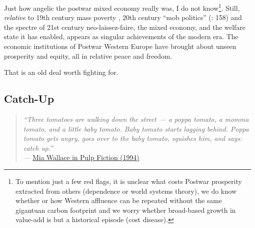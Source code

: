 \documentclass[11pt,a4paper,oneside,openright]{article}
\begin{document}
Just how angelic the postwar mixed economy really was, I do not know\footnote{
	To mention just a few red flags, it is unclear what costs Postwar prosperity extracted from others (dependence or world systems theory), we do know whether or how Western affluence can be repeated without the same gigantuan carbon footprint and we worry whether broad-based growth in value-add is but a historical episode (cost disease).}. 
Still, \emph{relative} to 19th century mass poverty \citep{MarxEngels-1848-aa}, 20th century ``mob politics'' (\citealt{Crouch2004}: 158) and the spectre of 21st century neo-laissez-faire, the mixed economy, and the welfare state it has enabled, appears as singular achievements of the modern era. The economic institutions of Postwar Western Europe have brought about unseen prosperity and equity, all in relative peace and freedom. 

That is an old deal worth fighting for.

\subsection{Catch-Up}
\begin{quote}
	\emph{``Three tomatoes are walking down the street --- a poppa tomato, a momma tomato, and a little baby tomato. Baby tomato starts lagging behind. Poppa tomato gets angry, goes over to the baby tomato, squishes him, and says: catch up.''} \\
	--- \href{http://www.youtube.com/watch?v=5D_QKY0_Bxk}{Mia Wallace in Pulp Fiction (1994)}
\end{quote}



\end{document}
